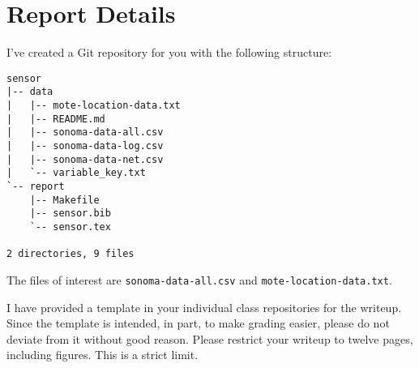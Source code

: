 \documentclass[11pt, oneside]{article}   	%
\begin{document}
\section{Report Details}

I've created a Git repository for you with the following structure:

\begin{verbatim}
sensor
|-- data
|   |-- mote-location-data.txt
|   |-- README.md
|   |-- sonoma-data-all.csv
|   |-- sonoma-data-log.csv
|   |-- sonoma-data-net.csv
|   `-- variable_key.txt
`-- report
    |-- Makefile
    |-- sensor.bib
    `-- sensor.tex

2 directories, 9 files
\end{verbatim}

The files of
interest are \texttt{sonoma-data-all.csv} and \texttt{mote-location-data.txt}.

I have provided a template in your individual class repositories for the
writeup. Since the template is intended, in part, to make grading easier,
please do not deviate from it without good reason.  Please restrict your
writeup to twelve pages, including figures. This is a strict limit.



\end{document}
